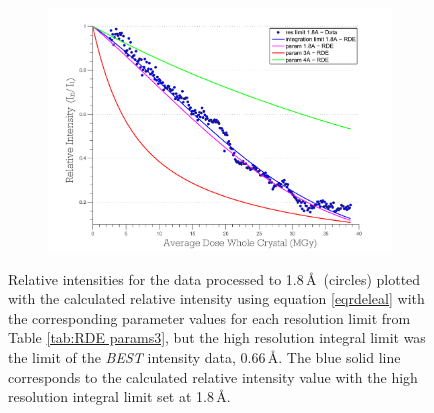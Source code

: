 \begin{figure}
\ContinuedFloat
    \begin{subfigure}[b]{1\textwidth}
        \centering
        \includegraphics[width=\textwidth]{figures/dwd/rescmpplot3.pdf}
        \caption{}
        \label{fig:Resolution comparison plot - integrated to diff res}
    \end{subfigure}
	\caption{Relative intensities for the data processed to 1.8\,\AA\ (circles) plotted with the calculated relative intensity using equation \ref{eqrdeleal} with the corresponding parameter values for each resolution limit from Table \ref{tab:RDE params3}, but the high resolution integral limit was the limit of the \emph{BEST} intensity data, 0.66$\,$\AA. The blue solid line corresponds to the calculated relative intensity value with the high resolution integral limit set at 1.8$\,$\AA.}
	\label{figrescont1}
\end{figure}
